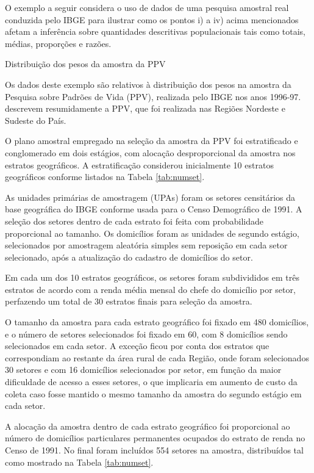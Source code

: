 \documentclass[]{book}
\theoremstyle{definition}
\theoremstyle{definition}
\theoremstyle{definition}
\theoremstyle{remark}
\let\BeginKnitrBlock\begin \let\EndKnitrBlock\end
\begin{document}
O exemplo a seguir considera o uso de dados de uma pesquisa amostral
real conduzida pelo IBGE para ilustrar como os pontos i) a iv) acima
mencionados afetam a inferência sobre quantidades descritivas
populacionais tais como totais, médias, proporções e razões.

\BeginKnitrBlock{example}
\protect\hypertarget{exm:distppv}{}{\label{exm:distppv} }Distribuição dos
pesos da amostra da PPV
\EndKnitrBlock{example}

Os dados deste exemplo são relativos à distribuição dos pesos na amostra
da Pesquisa sobre Padrões de Vida (PPV), realizada pelo IBGE nos anos
1996-97. \citep{albieri} descrevem resumidamente a PPV, que foi
realizada nas Regiões Nordeste e Sudeste do País.

O plano amostral empregado na seleção da amostra da PPV foi
estratificado e conglomerado em dois estágios, com alocação
desproporcional da amostra nos estratos geográficos. A estratificação
considerou inicialmente 10 estratos geográficos conforme listados na
Tabela \ref{tab:numset}.

As unidades primárias de amostragem (UPAs) foram os setores censitários
da base geográfica do IBGE conforme usada para o Censo Demográfico de
1991. A seleção dos setores dentro de cada estrato foi feita com
probabilidade proporcional ao tamanho. Os domicílios foram as unidades
de segundo estágio, selecionados por amostragem aleatória simples sem
reposição em cada setor selecionado, após a atualização do cadastro de
domicílios do setor.

Em cada um dos 10 estratos geográficos, os setores foram subdivididos em
três estratos de acordo com a renda média mensal do chefe do domicílio
por setor, perfazendo um total de 30 estratos finais para seleção da
amostra.

O tamanho da amostra para cada estrato geográfico foi fixado em 480
domicílios, e o número de setores selecionados foi fixado em 60, com 8
domicílios sendo selecionados em cada setor. A exceção ficou por conta
dos estratos que correspondiam ao restante da área rural de cada Região,
onde foram selecionados 30 setores e com 16 domicílios selecionados por
setor, em função da maior dificuldade de acesso a esses setores, o que
implicaria em aumento de custo da coleta caso fosse mantido o mesmo
tamanho da amostra do segundo estágio em cada setor.

A alocação da amostra dentro de cada estrato geográfico foi proporcional
ao número de domicílios particulares permanentes ocupados do estrato de
renda no Censo de 1991. No final foram incluídos 554 setores na amostra,
distribuídos tal como mostrado na Tabela \ref{tab:numset}.
\end{document}
